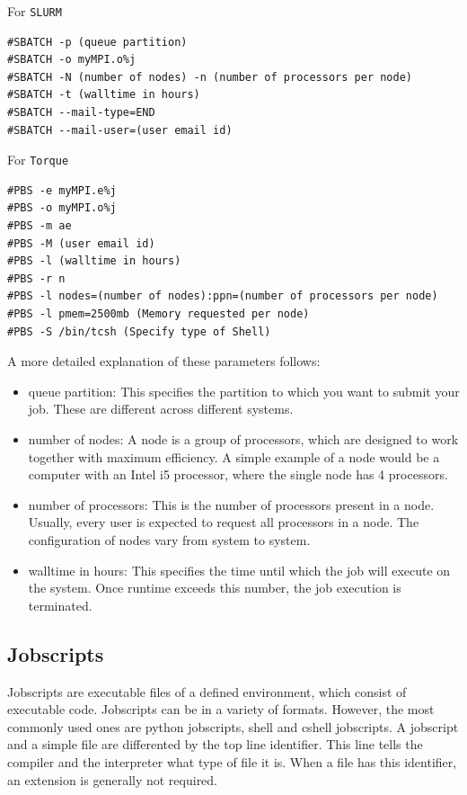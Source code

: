 \documentclass[11pt]{article}
\begin{document}
For \texttt{SLURM}
\begin{verbatim}
#SBATCH -p (queue partition)
#SBATCH -o myMPI.o%j
#SBATCH -N (number of nodes) -n (number of processors per node)
#SBATCH -t (walltime in hours)
#SBATCH --mail-type=END
#SBATCH --mail-user=(user email id)
\end{verbatim}

For \texttt{Torque}
\begin{verbatim}
#PBS -e myMPI.e%j
#PBS -o myMPI.o%j
#PBS -m ae
#PBS -M (user email id)	
#PBS -l (walltime in hours)
#PBS -r n
#PBS -l nodes=(number of nodes):ppn=(number of processors per node)
#PBS -l pmem=2500mb (Memory requested per node)
#PBS -S /bin/tcsh (Specify type of Shell)
\end{verbatim}

A more detailed explanation of these parameters follows:
\begin{itemize}
\item queue partition: This specifies the partition to which you want to submit your job. These are different across different systems.
\item number of nodes: A node is a group of processors, which are designed to work together with maximum efficiency. A simple example of a node would be a computer with an Intel i5 processor, where the single node has 4 processors.
\item number of processors: This is the number of processors present in a node. Usually, every user is expected to request all processors in a node. The configuration of nodes vary from system to system.
\item walltime in hours: This specifies the time until which the job will execute on the system. Once runtime exceeds this number, the job execution is terminated.
\end{itemize}

\subsection{Jobscripts}
\label{sec:orgc5562b4}
Jobscripts are executable files of a defined environment, which consist of executable code. Jobscripts can be in a variety of formats. However, the most commonly used ones are python jobscripts, shell and cshell jobscripts.
A jobscript and a simple file are differented by the top line identifier. This line tells the compiler and the interpreter what type of file it is. When a file has this identifier, an extension is generally not required. 
\end{document}
